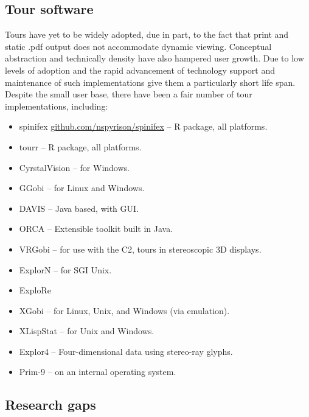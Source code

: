 \documentclass{monashthesis}
\begin{document}
\hypertarget{tour-software}{%
\subsection{Tour software}\label{tour-software}}

Tours have yet to be widely adopted, due in part, to the fact that print and static .pdf output does not accommodate dynamic viewing. Conceptual abstraction and technically density have also hampered user growth. Due to low levels of adoption and the rapid advancement of technology support and maintenance of such implementations give them a particularly short life span. Despite the small user base, there have been a fair number of tour implementations, including:

\begin{itemize}
\tightlist
\item
  spinifex \href{https://github.com/nspyrison/spinifex}{github.com/nspyrison/spinifex} -- R package, all platforms.
\item
  tourr \autocite{wickham_tourr_2011} -- R package, all platforms.
\item
  CyrstalVision \autocite{wegman_visual_2003} -- for Windows.
\item
  GGobi \autocite{swayne_ggobi:_2003} -- for Linux and Windows.
\item
  DAVIS \autocite{huh_davis:_2002} -- Java based, with GUI.
\item
  ORCA \autocite{sutherland_orca:_2000} -- Extensible toolkit built in Java.
\item
  VRGobi \autocite{nelson_xgobi_1998} -- for use with the C2, tours in stereoscopic 3D displays.
\item
  ExplorN \autocite{carr_explorn:_1996} -- for SGI Unix.
\item
  ExploRe \autocite{hardle_xplore:_1995}
\item
  XGobi \autocite{swayne_xgobi:_1991} -- for Linux, Unix, and Windows (via emulation).
\item
  XLispStat \autocite{tierney_lisp-stat:_1990} -- for Unix and Windows.
\item
  Explor4 \autocite{carr_explor4:_1988} -- Four-dimensional data using stereo-ray glyphs.
\item
  Prim-9 \autocite{asimov_grand_1985,fisherkeller_prim-9:_1974} -- on an internal operating system.
\end{itemize}

\hypertarget{research-gaps}{%
\subsection{Research gaps}\label{research-gaps}}
\end{document}

